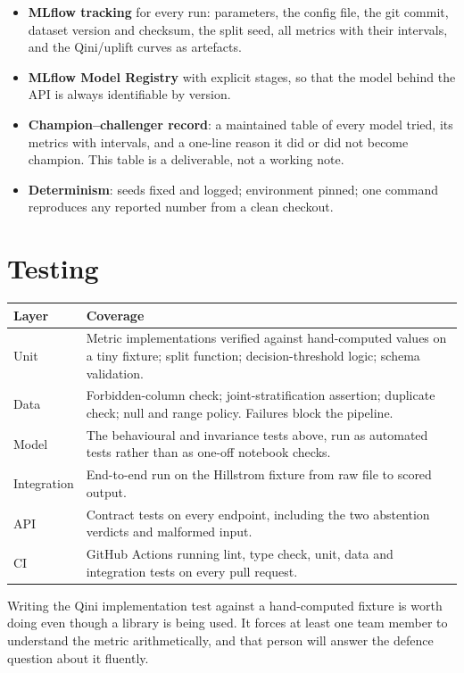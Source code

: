 \documentclass[11pt,a4paper]{article}
\begin{document}
\begin{itemize}
\item \textbf{MLflow tracking} for every run: parameters, the config file, the git commit, dataset
version and checksum, the split seed, all metrics with their intervals, and the Qini/uplift curves
as artefacts.
\item \textbf{MLflow Model Registry} with explicit stages, so that the model behind the API is
always identifiable by version.
\item \textbf{Champion--challenger record}: a maintained table of every model tried, its metrics with
intervals, and a one-line reason it did or did not become champion. This table is a deliverable, not
a working note.
\item \textbf{Determinism}: seeds fixed and logged; environment pinned; one command reproduces any
reported number from a clean checkout.
\end{itemize}

\section{Testing}

\begin{tabularx}{\textwidth}{@{}L{3.4cm}X@{}}
\toprule
\textbf{Layer} & \textbf{Coverage} \\
\midrule
Unit & Metric implementations verified against hand-computed values on a tiny fixture; split
function; decision-threshold logic; schema validation. \\
Data & Forbidden-column check; joint-stratification assertion; duplicate check; null and range
policy. Failures block the pipeline. \\
Model & The behavioural and invariance tests above, run as automated tests rather than as
one-off notebook checks. \\
Integration & End-to-end run on the Hillstrom fixture from raw file to scored output. \\
API & Contract tests on every endpoint, including the two abstention verdicts and malformed input. \\
CI & GitHub Actions running lint, type check, unit, data and integration tests on every pull
request. \\
\bottomrule
\end{tabularx}

\begin{goodbox}
Writing the Qini implementation test against a hand-computed fixture is worth doing even though a
library is being used. It forces at least one team member to understand the metric arithmetically,
and that person will answer the defence question about it fluently.
\end{goodbox}
\end{document}

